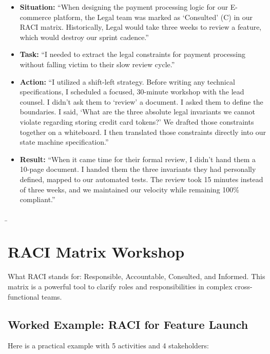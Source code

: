 \begin{itemize}
\tightlist
\item
  \textbf{Situation:} ``When designing the payment processing logic for
  our E-commerce platform, the Legal team was marked as `Consulted' (C)
  in our RACI matrix. Historically, Legal would take three weeks to
  review a feature, which would destroy our sprint cadence.''
\item
  \textbf{Task:} ``I needed to extract the legal constraints for payment
  processing without falling victim to their slow review cycle.''
\item
  \textbf{Action:} ``I utilized a shift-left strategy. Before writing
  any technical specifications, I scheduled a focused, 30-minute
  workshop with the lead counsel. I didn't ask them to `review' a
  document. I asked them to define the boundaries. I said, `What are the
  three absolute legal invariants we cannot violate regarding storing
  credit card tokens?' We drafted those constraints together on a
  whiteboard. I then translated those constraints directly into our
  state machine specification.''
\item
  \textbf{Result:} ``When it came time for their formal review, I didn't
  hand them a 10-page document. I handed them the three invariants they
  had personally defined, mapped to our automated tests. The review took
  15 minutes instead of three weeks, and we maintained our velocity
  while remaining 100\% compliant.''
\end{itemize}

\b

\section{RACI Matrix Workshop}\label{raci-matrix-workshop}

What RACI stands for: Responsible, Accountable, Consulted, and Informed.
This matrix is a powerful tool to clarify roles and responsibilities in
complex cross-functional teams.

\subsection{Worked Example: RACI for Feature
Launch}\label{worked-example-raci-for-feature-launch}

Here is a practical example with 5 activities and 4 stakeholders:


